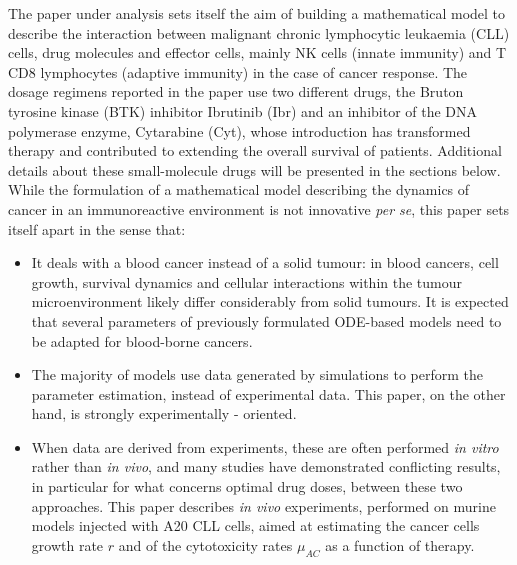 The paper under analysis sets itself the aim of building a mathematical model to describe the interaction between malignant chronic lymphocytic leukaemia (CLL) cells, drug molecules and effector cells, mainly NK cells (innate immunity) and T CD8 lymphocytes (adaptive immunity) in the case of cancer response.
The dosage regimens reported in the paper use two different drugs, the Bruton tyrosine kinase (BTK) inhibitor Ibrutinib (Ibr) and an inhibitor of the DNA polymerase enzyme, Cytarabine (Cyt), whose introduction has transformed therapy and contributed to extending the overall survival of patients. 
Additional details about these small-molecule drugs will be presented in the sections below. While the formulation of a mathematical model describing the dynamics of cancer in an immunoreactive environment is not innovative \textit{per se}, this paper sets itself apart in the sense that:
\begin{itemize}
\item It deals with a blood cancer instead of a solid tumour: in blood cancers, cell growth, survival dynamics and cellular interactions within the tumour microenvironment likely differ considerably from solid tumours. It is expected that several parameters of previously formulated ODE-based models need to be adapted for blood-borne cancers.
\item The majority of models use data generated by simulations to perform the parameter estimation, instead of experimental data. This paper, on the other hand, is strongly experimentally - oriented.
\item When data are derived from experiments, these are often performed \textit{in vitro} rather than \textit{in vivo}, and many studies have demonstrated conflicting results, in particular for what concerns optimal drug doses, between these two approaches. This paper describes \textit{in vivo} experiments, performed on murine models injected with A20 CLL cells, aimed at estimating the cancer cells growth rate $r$ and of the cytotoxicity rates $\mu_{AC}$ as a function of therapy. \par
\end{itemize}
